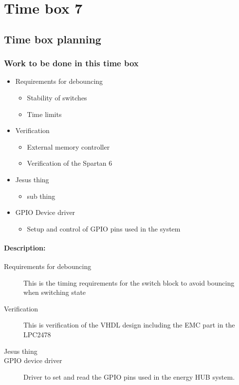 \section{Time box 7}
\listoftodos
\subsection{Time box planning}

\begin{figure}[H]
	\begin{centering}
	\end{centering}
\end{figure}

\subsubsection{Work to be done in this time box}
\begin{itemize}
	\item Requirements for debouncing
	\begin{itemize}
		\item Stability of switches
		\item Time limits
	\end{itemize}
	\item Verification
	\begin{itemize}
		\item External memory controller
		\item Verification of the Spartan 6
	\end{itemize}
	\item Jesus thing
		\begin{itemize}
			\item sub thing
		\end{itemize}
	\item GPIO Device driver
	\begin{itemize}
		\item Setup and control of GPIO pins used in the system
	\end{itemize}
\end{itemize}

\paragraph{Description:}
\begin{description}
	\item[Requirements for debouncing] This is the timing requirements for the switch block to avoid bouncing when switching state
	\item[Verification] This is verification of the VHDL design including the EMC part in the LPC2478
	\item[Jesus thing]
	\item[GPIO device driver] Driver to set and read the GPIO pins used in the energy HUB system. 
\end{description}

